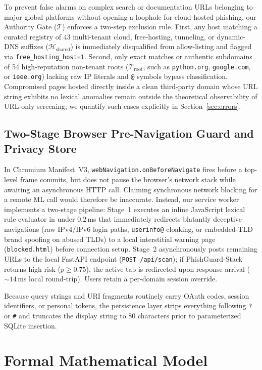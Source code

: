 \documentclass[conference]{IEEEtran}
\begin{document}
To prevent false alarms on complex search or documentation URLs belonging to major global platforms without opening a loophole for cloud-hosted phishing, our Authority Gate ($\mathcal{T}$) enforces a two-step exclusion rule. First, any host matching a curated registry of 43 multi-tenant cloud, free-hosting, tunneling, or dynamic-DNS suffixes ($\mathcal{H}_{\text{shared}}$) is immediately disqualified from allow-listing and flagged via \texttt{free\_hosting\_host=1}. Second, only exact matches or authentic subdomains of 54 high-reputation non-tenant roots ($\mathcal{T}_{\text{root}}$, such as \texttt{python.org}, \texttt{google.com}, or \texttt{ieee.org}) lacking raw IP literals and \texttt{@} symbols bypass classification. Compromised pages hosted directly inside a clean third-party domain whose URL string exhibits no lexical anomalies remain outside the theoretical observability of URL-only screening; we quantify such cases explicitly in Section~\ref{sec:errors}.

\subsection{Two-Stage Browser Pre-Navigation Guard and Privacy Store}
In Chromium Manifest~V3, \texttt{webNavigation.onBeforeNavigate} fires before a top-level frame commits, but does not pause the browser's network stack while awaiting an asynchronous HTTP call. Claiming synchronous network blocking for a remote ML call would therefore be inaccurate. Instead, our service worker implements a two-stage pipeline: Stage~1 executes an inline JavaScript lexical rule evaluator in under $0.2$\,ms that immediately redirects blatantly deceptive navigations (raw IPv4/IPv6 login paths, \texttt{userinfo@} cloaking, or embedded-TLD brand spoofing on abused TLDs) to a local interstitial warning page (\texttt{blocked.html}) before connection setup. Stage~2 asynchronously posts remaining URLs to the local FastAPI endpoint (\texttt{POST /api/scan}); if PhishGuard-Stack returns high risk ($p \ge 0.75$), the active tab is redirected upon response arrival ($\sim 14$\,ms local round-trip). Users retain a per-domain session override.

Because query strings and URI fragments routinely carry OAuth codes, session identifiers, or personal tokens, the persistence layer strips everything following \texttt{?} or \texttt{\#} and truncates the display string to 80 characters prior to parameterized SQLite insertion.

\section{Formal Mathematical Model}
\label{sec:math}
\end{document}
